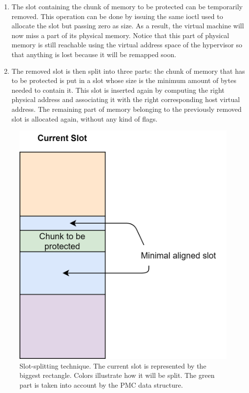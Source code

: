\begin{enumerate}
    \item The slot containing the chunk of memory to be protected can be temporarily removed. This operation can be done by issuing the same ioctl used to allocate the slot but passing zero as size. As a result, the virtual machine will now miss a part of its physical memory. Notice that this part of physical memory is still reachable using the virtual address space of the hypervisor so that anything is lost because it will be remapped soon.
    \item The removed slot is then split into three parts: the chunk of memory that has to be protected is put in a slot whose size is the minimum amount of bytes needed to contain it. This slot is inserted again by computing the right physical address and associating it with the right corresponding host virtual address. The remaining part of memory belonging to the previously removed slot is allocated again, without any kind of flags. 
\end{enumerate}
\begin{figure}
\centering
  \includegraphics[scale=1]{images/slot-splitting.png}
  \caption{Slot-splitting technique. The current slot is represented by the biggest rectangle. Colors illustrate how it will be split. The green part is taken into account by the PMC data structure.}
  \label{fig:slot-splitting}
\end{figure}
